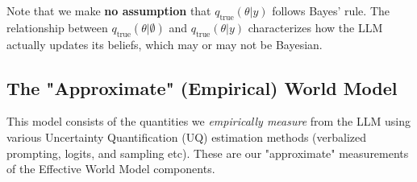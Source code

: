 \documentclass{article}
\theoremstyle{definition}
\begin{document}
Note that we make \textbf{no assumption} that $q_{\text{true}}(\theta|y)$ follows Bayes' rule. The relationship between $q_{\text{true}}(\theta|\emptyset)$ and $q_{\text{true}}(\theta|y)$ characterizes how the LLM actually updates its beliefs, which may or may not be Bayesian.



    
    



\subsection{The "Approximate" (Empirical) World Model}
This model consists of the quantities we \textit{empirically measure} from the LLM using various Uncertainty Quantification (UQ) estimation methods (verbalized prompting, logits, and sampling etc). These are our "approximate" measurements of the Effective World Model components.
\end{document}
